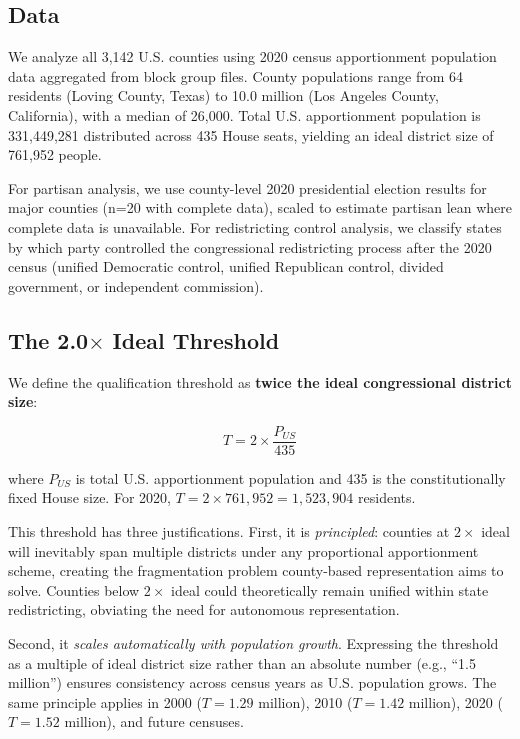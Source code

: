 \subsection{Data}

We analyze all 3,142 U.S. counties using 2020 census apportionment population data aggregated from block group files. County populations range from 64 residents (Loving County, Texas) to 10.0 million (Los Angeles County, California), with a median of 26,000. Total U.S. apportionment population is 331,449,281 distributed across 435 House seats, yielding an ideal district size of 761,952 people.

For partisan analysis, we use county-level 2020 presidential election results for major counties (n=20 with complete data), scaled to estimate partisan lean where complete data is unavailable. For redistricting control analysis, we classify states by which party controlled the congressional redistricting process after the 2020 census (unified Democratic control, unified Republican control, divided government, or independent commission).

\subsection{The 2.0$\times$ Ideal Threshold}

We define the qualification threshold as \textbf{twice the ideal congressional district size}:

\begin{equation}
T = 2 \times \frac{P_{US}}{435}
\end{equation}

where $P_{US}$ is total U.S. apportionment population and 435 is the constitutionally fixed House size. For 2020, $T = 2 \times 761,952 = 1,523,904$ residents.

This threshold has three justifications. First, it is \emph{principled}: counties at $2\times$ ideal will inevitably span multiple districts under any proportional apportionment scheme, creating the fragmentation problem county-based representation aims to solve. Counties below $2\times$ ideal could theoretically remain unified within state redistricting, obviating the need for autonomous representation.

Second, it \emph{scales automatically with population growth}. Expressing the threshold as a multiple of ideal district size rather than an absolute number (e.g., ``1.5 million'') ensures consistency across census years as U.S. population grows. The same principle applies in 2000 ($T = 1.29$ million), 2010 ($T = 1.42$ million), 2020 ($T = 1.52$ million), and future censuses.


